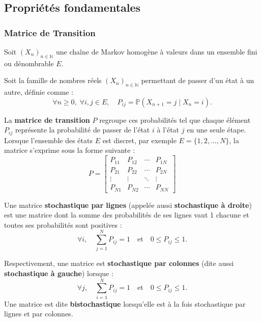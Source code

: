 \documentclass{article}
\begin{document}
\newpage
\subsection{Propriétés fondamentales}


\subsubsection{Matrice de Transition}

\begin{tcolorbox}[colback=white,colframe=red!80!black,title=Matrice de Transition]
Soit $(X_n)_{n \in \mathbb{N}}$ une chaîne de Markov homogène à valeurs dans un ensemble fini ou dénombrable $E$.

Soit la famille de nombres réels $(X_n)_{n \in \mathbb{N}}$ permettant de passer d'un état à un autre, définie comme :
\[
\forall n \geq 0,\; \forall i,j \in E,\quad P_{ij} = \mathbb{P}(X_{n+1} = j \mid X_n = i).
\]

La \textbf{matrice de transition} $P$ regroupe ces probabilités tel que chaque élément $P_{ij}$ représente la probabilité de passer de l'état $i$ à l'état $j$ en une seule étape.
Lorsque l'ensemble des états $E$ est discret, par exemple $E = \{1, 2, \dots, N\}$, la matrice s'exprime sous la forme suivante :
\[
P = \begin{bmatrix}
P_{11} & P_{12} & \cdots & P_{1N}\\[1mm]
P_{21} & P_{22} & \cdots & P_{2N}\\[1mm]
\vdots & \vdots & \ddots & \vdots\\[1mm]
P_{N1} & P_{N2} & \cdots & P_{NN}
\end{bmatrix}
\]

\end{tcolorbox}

\begin{tcolorbox}[colback=white,colframe=blue!80!black,title=Matrice stochastique par lignes/colonnes]
Une matrice \textbf{stochastique par lignes} (appelée aussi \textbf{stochastique à droite}) est une matrice dont la somme des probabilités de ses lignes vaut 1 chacune et toutes ses probabilités sont positives :
\[
\forall i, \quad \sum_{j=1}^{N} P_{ij} = 1 \quad \text{et} \quad 0 \leq P_{ij} \leq 1.
\]

Respectivement, une matrice est \textbf{stochastique par colonnes} (dite aussi \textbf{stochastique à gauche}) lorsque :
\[
\forall j, \quad \sum_{i=1}^{N} P_{ij} = 1 \quad \text{et} \quad 0 \leq P_{ij} \leq 1.
\]
Une matrice est dite \textbf{bistochastique} lorsqu'elle est à la fois stochastique par lignes et par colonnes.
\end{tcolorbox}
\end{document}
